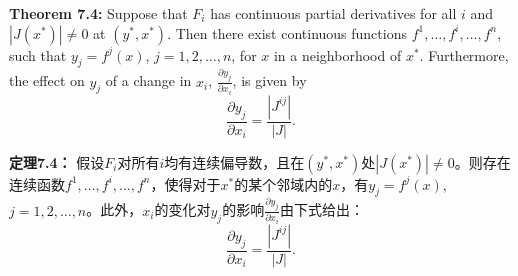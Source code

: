 \begin{original}
\textbf{Theorem 7.4:} Suppose that $F_i$ has continuous partial derivatives for all $i$ and $|J(x^*)| \ne 0$ at $(y^*, x^*)$. Then there exist continuous functions $f^1, \dots, f^i, \dots, f^n$, such that $y_j = f^j(x)$, $j = 1, 2, \dots, n$, for $x$ in a neighborhood of $x^*$. Furthermore, the effect on $y_j$ of a change in $x_i$, $\frac{\partial y_j}{\partial x_i}$, is given by
\[
\frac{\partial y_j}{\partial x_i} = \frac{|J^{ij}|}{|J|}.
\]
\end{original}
\begin{translation}
\textbf{定理7.4：} 假设$F_i$对所有$i$均有连续偏导数，且在$(y^*, x^*)$处$|J(x^*)| \ne 0$。则存在连续函数$f^1, \dots, f^i, \dots, f^n$，使得对于$x^*$的某个邻域内的$x$，有$y_j = f^j(x)$, $j = 1, 2, \dots, n$。此外，$x_i$的变化对$y_j$的影响$\frac{\partial y_j}{\partial x_i}$由下式给出：
\[
\frac{\partial y_j}{\partial x_i} = \frac{|J^{ij}|}{|J|}.
\]
\end{translation}

